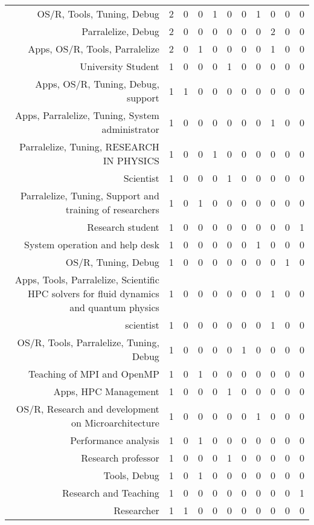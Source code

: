 {\begin{landscape}
\begin{longtable}[htb]{r|c|c|c|c|c|c|c|c|c|c}
{OS/R, Tools, Tuning, Debug} & 2 & 0 & 0 & 1 & 0 & 0 & 1 & 0 & 0 & 0 \\%
{Parralelize, Debug} & 2 & 0 & 0 & 0 & 0 & 0 & 0 & 2 & 0 & 0 \\%
{Apps, OS/R, Tools, Parralelize} & 2 & 0 & 1 & 0 & 0 & 0 & 0 & 1 & 0 & 0 \\%
{University Student} & 1 & 0 & 0 & 0 & 1 & 0 & 0 & 0 & 0 & 0 \\%
{Apps, OS/R, Tuning, Debug, support} & 1 & 1 & 0 & 0 & 0 & 0 & 0 & 0 & 0 & 0 \\%
{Apps, Parralelize, Tuning, System administrator} & 1 & 0 & 0 & 0 & 0 & 0 & 0 & 1 & 0 & 0 \\%
{Parralelize, Tuning, RESEARCH IN PHYSICS} & 1 & 0 & 0 & 1 & 0 & 0 & 0 & 0 & 0 & 0 \\%
{Scientist} & 1 & 0 & 0 & 0 & 1 & 0 & 0 & 0 & 0 & 0 \\%
{Parralelize, Tuning, Support and training of researchers} & 1 & 0 & 1 & 0 & 0 & 0 & 0 & 0 & 0 & 0 \\%
{Research student} & 1 & 0 & 0 & 0 & 0 & 0 & 0 & 0 & 0 & 1 \\%
{System operation and help desk} & 1 & 0 & 0 & 0 & 0 & 0 & 1 & 0 & 0 & 0 \\%
{OS/R, Tuning, Debug} & 1 & 0 & 0 & 0 & 0 & 0 & 0 & 0 & 1 & 0 \\%
{Apps, Tools, Parralelize, Scientific HPC solvers for fluid dynamics and quantum physics} & 1 & 0 & 0 & 0 & 0 & 0 & 0 & 1 & 0 & 0 \\%
{scientist} & 1 & 0 & 0 & 0 & 0 & 0 & 0 & 1 & 0 & 0 \\%
{OS/R, Tools, Parralelize, Tuning, Debug} & 1 & 0 & 0 & 0 & 0 & 1 & 0 & 0 & 0 & 0 \\%
{Teaching of MPI and OpenMP} & 1 & 0 & 1 & 0 & 0 & 0 & 0 & 0 & 0 & 0 \\%
{Apps, HPC Management} & 1 & 0 & 0 & 0 & 1 & 0 & 0 & 0 & 0 & 0 \\%
{OS/R, Research and development on Microarchitecture} & 1 & 0 & 0 & 0 & 0 & 0 & 1 & 0 & 0 & 0 \\%
{Performance analysis} & 1 & 0 & 1 & 0 & 0 & 0 & 0 & 0 & 0 & 0 \\%
{Research professor} & 1 & 0 & 0 & 0 & 1 & 0 & 0 & 0 & 0 & 0 \\%
{Tools, Debug} & 1 & 0 & 1 & 0 & 0 & 0 & 0 & 0 & 0 & 0 \\%
{Research and Teaching} & 1 & 0 & 0 & 0 & 0 & 0 & 0 & 0 & 0 & 1 \\%
{Researcher} & 1 & 1 & 0 & 0 & 0 & 0 & 0 & 0 & 0 & 0 \\%

\end{longtable}
\end{landscape}}
